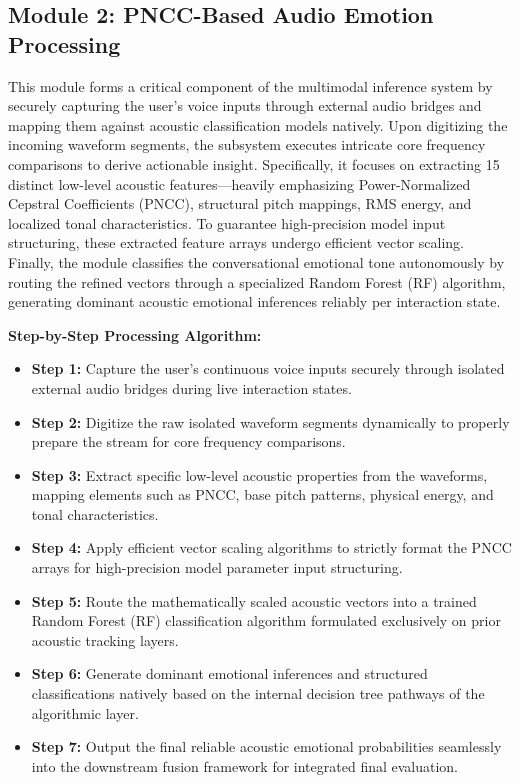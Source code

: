 \documentclass[11pt]{report}
\begin{document}
\subsection{Module 2: PNCC-Based Audio Emotion Processing}
This module forms a critical component of the multimodal inference system by securely capturing the user's voice inputs through external audio bridges and mapping them against acoustic classification models natively. Upon digitizing the incoming waveform segments, the subsystem executes intricate core frequency comparisons to derive actionable insight. Specifically, it focuses on extracting 15 distinct low-level acoustic features—heavily emphasizing Power-Normalized Cepstral Coefficients (PNCC), structural pitch mappings, RMS energy, and localized tonal characteristics. To guarantee high-precision model input structuring, these extracted feature arrays undergo efficient vector scaling. Finally, the module classifies the conversational emotional tone autonomously by routing the refined vectors through a specialized Random Forest (RF) algorithm, generating dominant acoustic emotional inferences reliably per interaction state.

\vspace{0.3cm}
\textbf{Step-by-Step Processing Algorithm:}
\begin{itemize}
    \item \textbf{Step 1:} Capture the user's continuous voice inputs securely through isolated external audio bridges during live interaction states.
    \item \textbf{Step 2:} Digitize the raw isolated waveform segments dynamically to properly prepare the stream for core frequency comparisons.
    \item \textbf{Step 3:} Extract specific low-level acoustic properties from the waveforms, mapping elements such as PNCC, base pitch patterns, physical energy, and tonal characteristics.
    \item \textbf{Step 4:} Apply efficient vector scaling algorithms to strictly format the PNCC arrays for high-precision model parameter input structuring.
    \item \textbf{Step 5:} Route the mathematically scaled acoustic vectors into a trained Random Forest (RF) classification algorithm formulated exclusively on prior acoustic tracking layers.
    \item \textbf{Step 6:} Generate dominant emotional inferences and structured classifications natively based on the internal decision tree pathways of the algorithmic layer.
    \item \textbf{Step 7:} Output the final reliable acoustic emotional probabilities seamlessly into the downstream fusion framework for integrated final evaluation.
\end{itemize}
\end{document}
